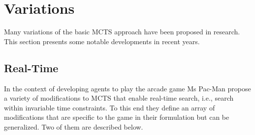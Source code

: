 \section{Variations}
\label{sec:variations}
Many variations of the basic MCTS approach have been proposed in research. This section presents some notable developments in recent years.
\subsection{Real-Time}
In the context of developing agents to play the arcade game Ms Pac-Man \cite{pepels2014real} propose a variety of modifications to MCTS that enable real-time search, i.e., search within invariable time constraints. To this end they define an array of modifications that are specific to the game in their formulation but can be generalized. Two of them are described below.


